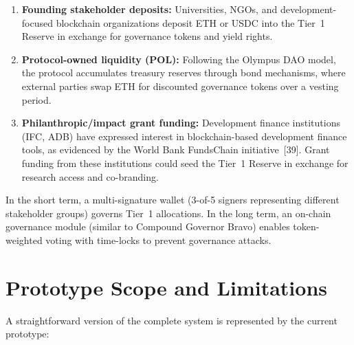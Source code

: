 \documentclass[12pt,a4paper]{report}
\begin{document}
\begin{enumerate}[noitemsep]
\item \textbf{Founding stakeholder deposits:} Universities, NGOs, and development-focused blockchain organizations deposit ETH or USDC into the Tier~1 Reserve in exchange for governance tokens and yield rights.
\item \textbf{Protocol-owned liquidity (POL):} Following the Olympus DAO model, the protocol accumulates treasury reserves through bond mechanisms, where external parties swap ETH for discounted governance tokens over a vesting period.
\item \textbf{Philanthropic/impact grant funding:} Development finance institutions (IFC, ADB) have expressed interest in blockchain-based development finance tools, as evidenced by the World Bank FundsChain initiative~[39]. Grant funding from these institutions could seed the Tier~1 Reserve in exchange for research access and co-branding.
\end{enumerate}

In the short term, a multi-signature wallet (3-of-5 signers representing different stakeholder groups) governs Tier~1 allocations. In the long term, an on-chain governance module (similar to Compound Governor Bravo) enables token-weighted voting with time-locks to prevent governance attacks.

\section{Prototype Scope and Limitations}

A straightforward version of the complete system is represented by the current prototype:
\end{document}
